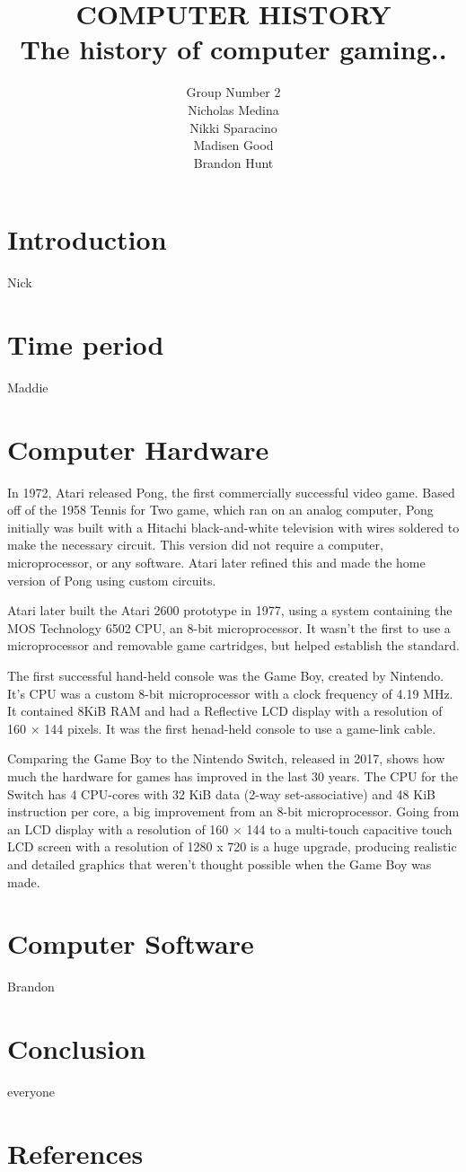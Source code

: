\documentclass[letterpaper, 10 pt, conference]{IEEEconf}
\title{\LARGE \bf
COMPUTER HISTORY\\
\large The history of computer gaming..
}
\author{Group Number 2\\
\small Nicholas Medina\\
\small Nikki Sparacino\\
\small Madisen Good\\
\small Brandon Hunt\\
}
\begin{document}
\maketitle 

\section{Introduction}
Nick
\section{Time period}
Maddie
\section{Computer Hardware}
In 1972, Atari released Pong,  the first commercially successful video game. Based off of the 1958 Tennis for Two game, which ran on an analog computer, Pong initially was built  with a Hitachi black-and-white television with wires soldered to make the necessary circuit. This version did not require a computer, microprocessor, or any software. Atari later refined this and made the home version of Pong using custom circuits.

Atari later built the Atari 2600 prototype in 1977, using a system containing the MOS Technology 6502 CPU, an 8-bit microprocessor. It wasn’t the first to use a microprocessor and removable game cartridges, but helped establish the standard.

The first successful hand-held console was the Game Boy, created by Nintendo. It’s CPU was a custom 8-bit microprocessor with a clock frequency of 4.19 MHz. It contained 8KiB RAM and had a Reflective LCD display with a resolution of 160 × 144 pixels. It was the first henad-held console to use a game-link cable.

Comparing the Game Boy to the Nintendo Switch, released in 2017, shows how much the hardware for games has improved in the last 30 years. The CPU for the Switch has 4 CPU-cores with 32 KiB data (2-way set-associative) and 48 KiB instruction per core, a big improvement from an 8-bit microprocessor. Going from an LCD display with a resolution of 160 × 144 to a multi-touch capacitive touch LCD screen with a resolution of 1280 x 720 is a huge upgrade, producing realistic and detailed graphics that weren’t thought possible when the Game Boy was made.
\section{Computer Software}
Brandon
\section{Conclusion}
everyone
\section{References}
\end{document}
